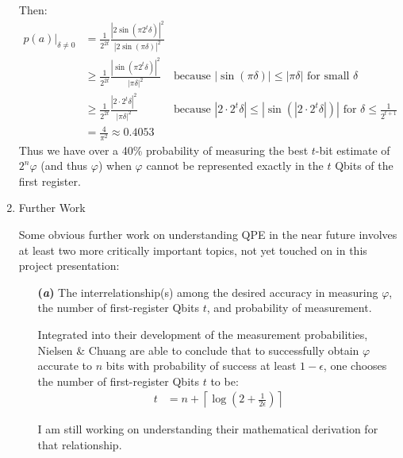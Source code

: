 \documentclass{article}
\begin{document}
\begin{enumerate}[label=\textbf{(\arabic*)}]
Then:
\begin{align}
    p(a)\rvert_{\delta\ne 0}
    &=
    \frac{1}{2^{2t}}
    \frac{|2\sin(\pi 2^t \delta)|^2}
    {|2\sin(\pi \delta)|^2}\\
    &\ge
    \frac{1}{2^{2t}}
    \frac{|\sin(\pi 2^t \delta)|^2}
    {|\pi \delta|^2} &
    \text{because }|\sin(\pi \delta)| \le |\pi\delta| \text{ for small } \delta\\
    &\ge
    \frac{1}{2^{2t}}
    \frac{|2\cdot 2^t \delta|^2}
    {|\pi \delta|^2} &
    \text{because }|2\cdot 2^t \delta| \le |\sin(|2\cdot 2^t \delta|)| \text{ for } \delta\le\frac{1}{2^{t+1}}\\
    &=
    \frac{4}{\pi^2} \approx 0.4053
\end{align}
Thus we have over a 40\% probability of measuring the best $t$-bit estimate of $2^n\varphi$ (and thus $\varphi$) when $\varphi$ cannot be represented exactly in the $t$ Qbits of the first register.

\vspace{0.1in}

\item Further Work

\vspace{0.1in}

Some obvious further work on understanding QPE in the near future involves at least two more critically important topics, not yet touched on in this project presentation:

\begin{itemize}
    \item[\textbf{(\textit{a})}] The interrelationship(s) among the desired accuracy in measuring $\varphi$, the number of first-register Qbits $t$, and probability of measurement.
    
    \vspace{0.1in}
    
    Integrated into their development of the measurement probabilities, Nielsen \& Chuang are able to conclude that to successfully obtain $\varphi$ accurate to $n$ bits with probability of success at least $1-\epsilon$, one chooses the number of first-register Qbits $t$ to be:
    \begin{align}
        t
        &=
        n + \left\lceil \log(2 + \frac{1}{2\epsilon}) \right\rceil
    \end{align}
    
    I am still working on understanding their mathematical derivation for that relationship.
    

\end{itemize}
\end{enumerate}
\end{document}
